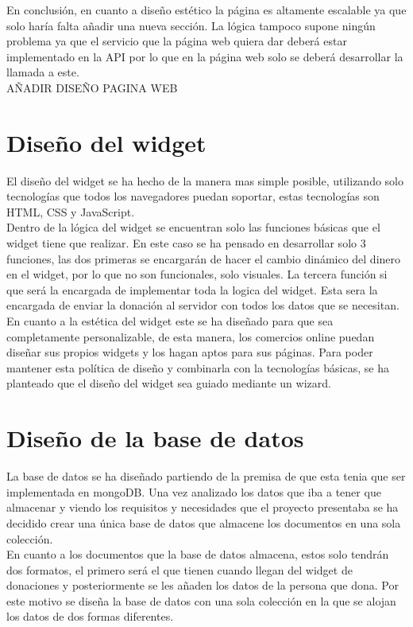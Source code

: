 En conclusión, en cuanto a diseño estético la página es altamente escalable ya que solo haría falta añadir una nueva sección. La lógica tampoco supone ningún problema ya que el servicio que la página web quiera dar deberá estar implementado en la API por lo que en la página web solo se deberá desarrollar la llamada a este.\\

AÑADIR DISEÑO PAGINA WEB

\section{Diseño del widget}
El diseño del widget se ha hecho de la manera mas simple posible, utilizando solo tecnologías que todos los navegadores puedan soportar, estas tecnologías son HTML, CSS y JavaScript.\\

Dentro de la lógica del widget se encuentran solo las funciones básicas que el widget tiene que realizar. En este caso se ha pensado en desarrollar solo 3 funciones, las dos primeras se encargarán de hacer el cambio dinámico del dinero en el widget, por lo que no son funcionales, solo visuales. La tercera función si que será la encargada de implementar toda la logica del widget. Esta sera la encargada de enviar la donación al servidor con todos los datos que se necesitan.\\

En cuanto a la estética del widget este se ha diseñado para que sea completamente personalizable, de esta manera, los comercios online puedan diseñar sus propios widgets y los hagan aptos para sus páginas. Para poder mantener esta política de diseño y combinarla con la tecnologías básicas, se ha planteado que el diseño del widget sea guiado mediante un wizard.

\section{Diseño de la base de datos}
La base de datos se ha diseñado partiendo de la premisa de que esta tenia que ser implementada en mongoDB. Una vez analizado los datos que iba a tener que almacenar y viendo los requisitos y necesidades que el proyecto presentaba se ha decidido crear una única base de datos que almacene los documentos en una sola colección.\\

En cuanto a los documentos que la base de datos almacena, estos solo tendrán dos formatos, el primero será el que tienen cuando llegan del widget de donaciones y posteriormente se les añaden los datos de la persona que dona. Por este motivo se diseña la base de datos con una sola colección en la que se alojan los datos de dos formas diferentes.\\

